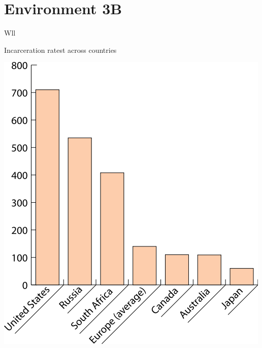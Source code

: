 %
%
\section{Environment 3B}

\begin{chart}{W}{ll}
\caption{Incarceration ratest across countries}
\label{chart:incarceration}
\includegraphics[width=\chartwidth,height=\chartheight]{incarceration}  
\end{chart}

\lipsum[1-4]

